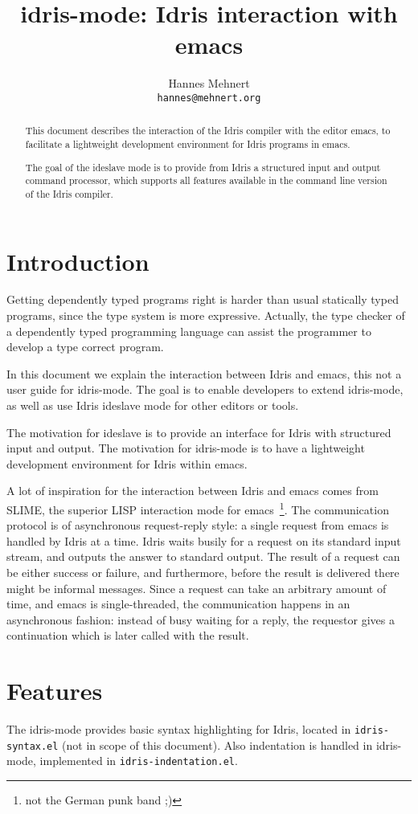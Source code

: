 \documentclass{article}
\title{idris-mode: Idris interaction with emacs}
\author{Hannes Mehnert\\\texttt{hannes@mehnert.org}}
\begin{document}
\sloppy
\maketitle

\begin{abstract}
This document describes the interaction of the Idris compiler with the editor emacs, to facilitate a lightweight development environment for Idris programs in emacs.

The goal of the ideslave mode is to provide from Idris a structured input and output command processor, which supports all features available in the command line version of the Idris compiler.
\end{abstract}

\section{Introduction}
Getting dependently typed programs right is harder than usual statically typed programs, since the type system is more expressive.
Actually, the type checker of a dependently typed programming language can assist the programmer to develop a type correct program.

In this document we explain the interaction between Idris and emacs, this not a user guide for idris-mode.
The goal is to enable developers to extend idris-mode, as well as use Idris ideslave mode for other editors or tools.

The motivation for ideslave is to provide an interface for Idris with structured input and output.
The motivation for idris-mode is to have a lightweight development environment for Idris within emacs.

A lot of inspiration for the interaction between Idris and emacs comes from SLIME, the superior LISP interaction mode for emacs~\footnote{not the German punk band ;)}.
The communication protocol is of asynchronous request-reply style: a single request from emacs is handled by Idris at a time.
Idris waits busily for a request on its standard input stream, and outputs the answer to standard output.
The result of a request can be either success or failure, and furthermore, before the result is delivered there might be informal messages.
Since a request can take an arbitrary amount of time, and emacs is single-threaded, the communication happens in an asynchronous fashion: instead of busy waiting for a reply, the requestor gives a continuation which is later called with the result.

\section{Features}
The idris-mode provides basic syntax highlighting for Idris, located in \texttt{idris-syntax.el} (not in scope of this document).
Also indentation is handled in idris-mode, implemented in \texttt{idris-indentation.el}.
\end{document}
